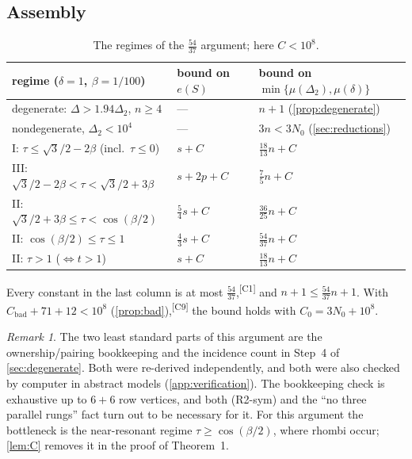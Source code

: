 \documentclass[11pt]{amsart}
\theoremstyle{definition}
\theoremstyle{remark}
\newtheorem{remark}[theorem]{Remark}
\newcommand{\Dt}{\Delta_2}
\newcommand{\mult}{\mu}
\newcommand{\chk}[1]{\textsuperscript{[#1]}}
\begin{document}
\subsection*{Assembly}
\begin{table}[ht]
\centering
\renewcommand{\arraystretch}{1.2}
\begin{tabular}{@{}lll@{}}
\toprule
regime ($\delta=1$, $\beta=1/100$) & bound on $e(S)$ & bound on $\min\{\mult(\Dt),\mult(\delta)\}$\\
\midrule
degenerate: $\Delta>1.94\Dt$, $n\ge4$ & --- & $n+1$ (\cref{prop:degenerate})\\
nondegenerate, $\Dt<10^4$ & --- & $3n<3N_0$ (\cref{sec:reductions})\\
I: $\tau\le\sqrt3/2-2\beta$ (incl.\ $\tau\le0$) & $s+C$ & $\frac{18}{13}n+C$\\
III: $\sqrt3/2-2\beta<\tau<\sqrt3/2+3\beta$ & $s+2p+C$ & $\frac75n+C$\\
II: $\sqrt3/2+3\beta\le\tau<\cos(\beta/2)$ & $\frac54s+C$ & $\frac{36}{25}n+C$\\
II: $\cos(\beta/2)\le\tau\le1$ & $\frac43s+C$ & $\frac{54}{37}n+C$\\
II: $\tau>1$ ($\Leftrightarrow t>1$) & $s+C$ & $\frac{18}{13}n+C$\\
\bottomrule
\end{tabular}
\caption{The regimes of the $\frac{54}{37}$ argument; here $C<10^8$.}
\end{table}
Every constant in the last column is at most $\frac{54}{37}$,\chk{C1} and $n+1\le\frac{54}{37}n+1$. With $C_{\mathrm{bad}}+71+12<10^8$ (\cref{prop:bad}),\chk{C9} the bound holds with $C_0=3N_0+10^8$.

\begin{remark}
The two least standard parts of this argument are the ownership/pairing bookkeeping and the incidence count in Step~4 of \cref{sec:degenerate}. Both were re-derived independently, and both were also checked by computer in abstract models (\cref{app:verification}). The bookkeeping check is exhaustive up to $6+6$ row vertices, and both (R2-sym) and the ``no three parallel rungs'' fact turn out to be necessary for it. For this argument the bottleneck is the near-resonant regime $\tau\ge\cos(\beta/2)$, where rhombi occur; \cref{lem:C} removes it in the proof of Theorem~1.
\end{remark}



\end{document}

